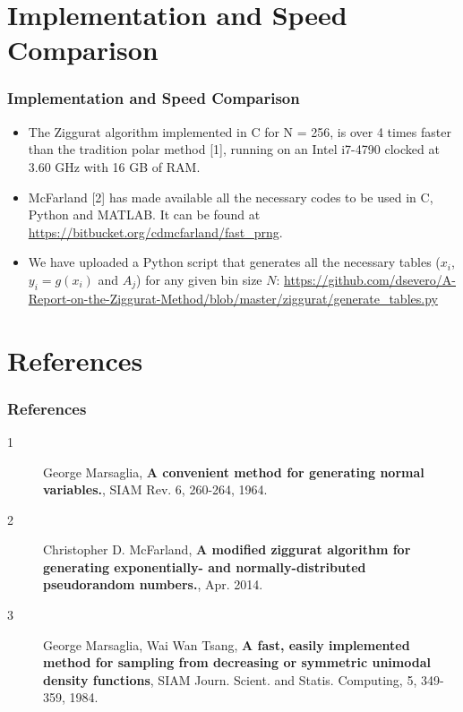\documentclass{beamer}
\begin{document}
\section{Implementation and Speed Comparison}
\begin{frame}
\frametitle{Implementation and Speed Comparison}
	\begin{itemize}
		\item The Ziggurat algorithm implemented in C for N = 256, is over 4 times
faster than the tradition polar method [1], running on an Intel i7-4790 clocked at 3.60 GHz with 16
GB of RAM.
		\item McFarland [2] has made available all the necessary codes to be used in C, Python and MATLAB. It can be found at \url{https://bitbucket.org/cdmcfarland/fast_prng}.
		\item We have uploaded a Python script that generates all the necessary tables ($x_i$, $y_i=g(x_i)$ and $A_j$) for any given bin size $N$: \url{https://github.com/dsevero/A-Report-on-the-Ziggurat-Method/blob/master/ziggurat/generate_tables.py}
	\end{itemize}
\end{frame}

\section{References}
	
\begin{frame}
\frametitle{References}
\begin{description}
\item[1] George Marsaglia, \textbf{A convenient method for generating normal variables.}, SIAM Rev. 6, 260-264, 1964.
\item[2] Christopher D. McFarland, \textbf{A modified ziggurat algorithm for generating exponentially- and normally-distributed pseudorandom numbers.}, Apr. 2014.
\item[3] George Marsaglia, Wai Wan Tsang, \textbf{A fast, easily implemented method for sampling from decreasing or symmetric unimodal density functions}, SIAM Journ. Scient. and Statis. Computing, 5, 349-359, 1984.
\end{description}
\end{frame}
\end{document}
